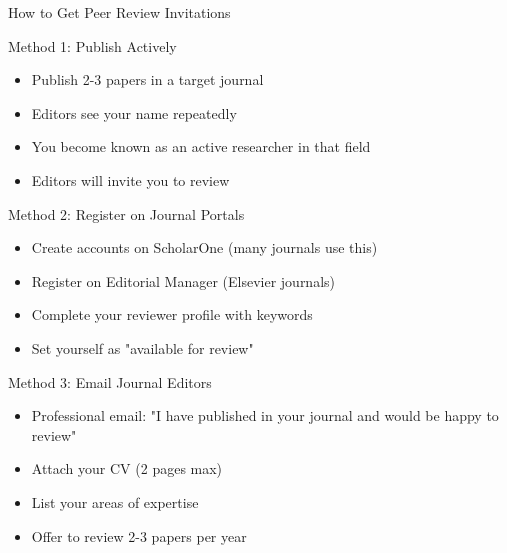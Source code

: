 \documentclass[11pt]{beamer}
\begin{document}
				\begin{frame}{How to Get Peer Review Invitations}
					\scriptsize
					\begin{block}{Method 1: Publish Actively}
						\begin{itemize}
							\item Publish 2-3 papers in a target journal
							\item Editors see your name repeatedly
							\item You become known as an active researcher in that field
							\item Editors will invite you to review
						\end{itemize}
					\end{block}
					\begin{block}{Method 2: Register on Journal Portals}
						\begin{itemize}
							\item Create accounts on ScholarOne (many journals use this)
							\item Register on Editorial Manager (Elsevier journals)
							\item Complete your reviewer profile with keywords
							\item Set yourself as "available for review"
						\end{itemize}
					\end{block}
					\begin{block}{Method 3: Email Journal Editors}
						\begin{itemize}
							\item Professional email: "I have published in your journal and would be happy to review"
							\item Attach your CV (2 pages max)
							\item List your areas of expertise
							\item Offer to review 2-3 papers per year
						\end{itemize}
					\end{block}
				\end{frame}
				
\end{document}
